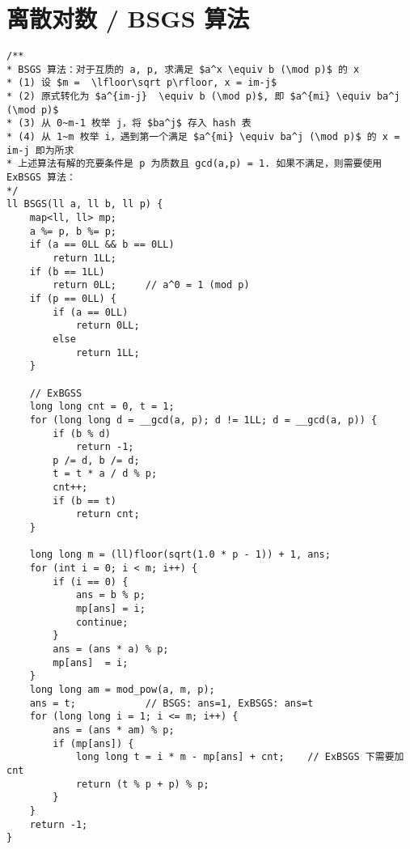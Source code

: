 \section{离散对数 / BSGS 算法}
\begin{verbatim}
/**
* BSGS 算法：对于互质的 a, p, 求满足 $a^x \equiv b (\mod p)$ 的 x 
* (1) 设 $m =  \lfloor\sqrt p\rfloor, x = im-j$
* (2) 原式转化为 $a^{im-j}  \equiv b (\mod p)$, 即 $a^{mi} \equiv ba^j (\mod p)$
* (3) 从 0~m-1 枚举 j，将 $ba^j$ 存入 hash 表 
* (4) 从 1~m 枚举 i，遇到第一个满足 $a^{mi} \equiv ba^j (\mod p)$ 的 x = im-j 即为所求
* 上述算法有解的充要条件是 p 为质数且 gcd(a,p) = 1. 如果不满足，则需要使用 ExBSGS 算法：
*/
ll BSGS(ll a, ll b, ll p) {
    map<ll, ll> mp;
    a %= p, b %= p;
    if (a == 0LL && b == 0LL)
        return 1LL;
    if (b == 1LL)
        return 0LL;     // a^0 = 1 (mod p)
    if (p == 0LL) {
        if (a == 0LL)
            return 0LL;
        else
            return 1LL;
    }
    
    // ExBGSS
    long long cnt = 0, t = 1;
    for (long long d = __gcd(a, p); d != 1LL; d = __gcd(a, p)) {
        if (b % d)
            return -1;
        p /= d, b /= d;
        t = t * a / d % p;
        cnt++;
        if (b == t)
            return cnt;
    }
    
    long long m = (ll)floor(sqrt(1.0 * p - 1)) + 1, ans;
    for (int i = 0; i < m; i++) {
        if (i == 0) {
            ans = b % p;
            mp[ans] = i;
            continue;
        }
        ans = (ans * a) % p;
        mp[ans]  = i;
    }
    long long am = mod_pow(a, m, p);
    ans = t;            // BSGS: ans=1, ExBSGS: ans=t
    for (long long i = 1; i <= m; i++) {
        ans = (ans * am) % p;
        if (mp[ans]) {
            long long t = i * m - mp[ans] + cnt;    // ExBSGS 下需要加 cnt 
            return (t % p + p) % p;
        }
    }
    return -1;
}    
\end{verbatim}